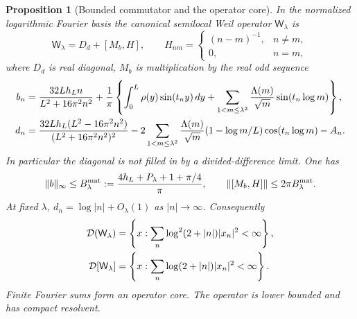 \documentclass[11pt]{article}
\newtheorem{proposition}[theorem]{Proposition}
\theoremstyle{remark}
\begin{document}
\begin{proposition}[Bounded commutator and the operator core]
\label{prop:v114-weil-core}
In the normalized logarithmic Fourier basis the canonical semilocal
Weil operator $\mathsf W_\lambda$ is
\begin{equation}\label{eq:v114-weil-decomposition}
 \mathsf W_\lambda=D_d+[M_b,H],\qquad
 H_{nm}=\begin{cases}(n-m)^{-1},&n\ne m,\\0,&n=m,\end{cases}
\end{equation}
where $D_d$ is real diagonal, $M_b$ is multiplication by the real odd
sequence
\begin{align}
 b_n={}&\frac{32Lh_Ln}{L^2+16\pi^2n^2}
 +\frac1\pi\left\{\int_0^L\rho(y)\sin(t_ny)\,dy
 +\sum_{1<m\le\lambda^2}\frac{\Lambda(m)}{\sqrt m}
                         \sin(t_n\log m)\right\},\notag\\
 d_n={}&\frac{32Lh_L(L^2-16\pi^2n^2)}{(L^2+16\pi^2n^2)^2}
 -2\sum_{1<m\le\lambda^2}\frac{\Lambda(m)}{\sqrt m}
        (1-\log m/L)\cos(t_n\log m)-A_n.
 \label{eq:v114-b-d}
\end{align}
In particular the diagonal is not filled in by a divided-difference limit.
One has
\begin{equation}\label{eq:v114-b-bound}
 \|b\|_\infty\le B_\lambda^{\rm mat}
 :=\frac{4h_L+P_\lambda+1+\pi/4}{\pi},\qquad
 \|[M_b,H]\|\le2\pi B_\lambda^{\rm mat}.
\end{equation}
At fixed $\lambda$, $d_n=\log|n|+O_\lambda(1)$ as $|n|\to\infty$.
Consequently
\begin{align}
 \mathcal D(\mathsf W_\lambda)
 &=\left\{x:\sum_n\log^2(2+|n|)|x_n|^2<\infty\right\},\notag\\
 \mathcal D[\mathsf W_\lambda]
 &=\left\{x:\sum_n\log(2+|n|)|x_n|^2<\infty\right\}.
 \label{eq:v114-weil-domains}
\end{align}
Finite Fourier sums form an operator core. The operator is lower bounded
and has compact resolvent.
\end{proposition}
\end{document}
